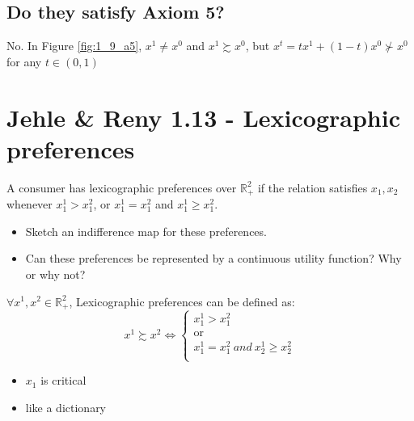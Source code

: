 \documentclass{article}
\newcommand{\R}{\mathbb{R}}
\begin{document}
\subsection{Do they satisfy Axiom 5?}

No. In Figure \ref{fig:1_9_a5}, $x^1 \ne x^0$ and $x^1 \succsim x^0$, but
$x^t=tx^1+(1-t)x^0 \nsucc x^0$ for any $t \in (0,1)$


{\centering
{}
\label{fig:1_9_a5}}


\section{Jehle \& Reny 1.13 - Lexicographic preferences}
A consumer has lexicographic preferences over $\R^2_+$ if the relation  satisfies $x_1, x_2$ whenever
$x_1^1 > x_1^2$, or $x_1^1 = x_1^2$ and $x_1^1 \ge x_1^2$.

\begin{itemize}
\item Sketch an indifference map for these preferences.
\item Can these preferences be represented by a continuous utility function? Why or why not?
\end{itemize}

\begin{mdframed}[backgroundcolor=blue!20,linecolor=white]
$\forall x^1,x^2 \in \R^2_+$, Lexicographic preferences can be defined as:
\begin{equation}
x^1 \succsim x^2 \Leftrightarrow
    \begin{cases}
      \text{$x^1_1 > x^2_1$}\\
      \text{or}\\
      \text{$x^1_1 = x^2_1 \ and \ x^1_2 \ge x^2_2$}\\
    \end{cases}
    \label{eq:laxi}  
\end{equation}
\begin{itemize}
\item $x_1$ is critical
\item like a dictionary
\end{itemize}
\end{mdframed}
\end{document}

